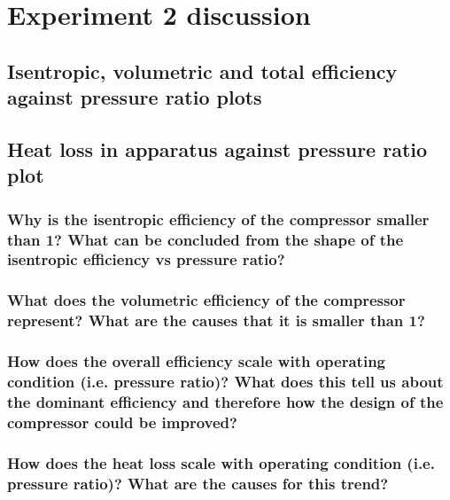 \documentclass[class=article, crop=false, 12pt,a4paper]{standalone}
\numberwithin{equation}{section}
\begin{document}
\section{Experiment 2 discussion}
\subsection{Isentropic, volumetric and total efficiency against pressure ratio plots}
\subsection{Heat loss in apparatus against pressure ratio plot}
\subsubsection{Why is the isentropic efficiency of the compressor smaller than 1? What can be concluded from the shape of the isentropic efficiency vs pressure ratio?}
\subsubsection{What does the volumetric efficiency of the compressor represent? What are the causes that it is smaller than 1?}
\subsubsection{How does the overall efficiency scale with operating condition (i.e. pressure ratio)? What does this tell us about the dominant efficiency and therefore how the design of the compressor could be improved?} 
\subsubsection{How does the heat loss scale with operating condition (i.e. pressure ratio)? What are the causes for this trend?}
\listoffigures
\end{document}
